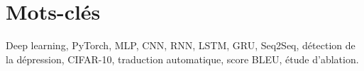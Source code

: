 \documentclass[a4paper,11pt,oneside]{report}
\begin{document}
\chapter*{Mots-clés}
Deep learning, PyTorch, MLP, CNN, RNN, LSTM, GRU, Seq2Seq, détection de la dépression, CIFAR-10, traduction automatique, score BLEU, étude d'ablation.

\tableofcontents
\clearpage
{}









\appendix




\end{document}
